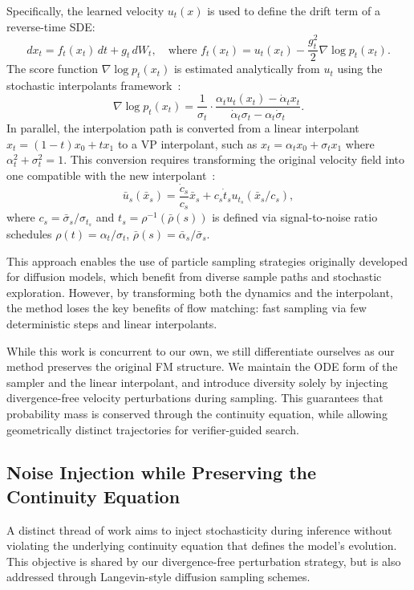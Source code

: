 \documentclass{article}
\begin{document}
Specifically, the learned velocity \( u_t(x) \) is used to define the drift term of a reverse-time SDE:
\[
d x_t = f_t(x_t)\,dt + g_t\,dW_t, \quad \text{where } f_t(x_t) = u_t(x_t) - \frac{g_t^2}{2} \nabla \log p_t(x_t).
\]
The score function \( \nabla \log p_t(x_t) \) is estimated analytically from \( u_t \) using the stochastic interpolants framework~\cite{ma2024sit}:
\[
\nabla \log p_t(x_t) = \frac{1}{\sigma_t} \cdot \frac{\alpha_t u_t(x_t) - \dot{\alpha}_t x_t}{\dot{\alpha}_t \sigma_t - \alpha_t \dot{\sigma}_t}.
\]
In parallel, the interpolation path is converted from a linear interpolant \( x_t = (1 - t)x_0 + t x_1 \) to a VP interpolant, such as \( x_t = \alpha_t x_0 + \sigma_t x_1 \) where \(\alpha_t^2 + \sigma_t^2 = 1\). This conversion requires transforming the original velocity field into one compatible with the new interpolant~\cite{kim2025flowits}:
\[
\bar{u}_s(\bar{x}_s) = \frac{\dot{c}_s}{c_s} \bar{x}_s + c_s \dot{t}_s u_{t_s}(\bar{x}_s / c_s),
\]
where \(c_s = \bar{\sigma}_s / \sigma_{t_s}\) and \(t_s = \rho^{-1}(\bar{\rho}(s))\) is defined via signal-to-noise ratio schedules \(\rho(t) = \alpha_t/\sigma_t\), \(\bar{\rho}(s) = \bar{\alpha}_s/\bar{\sigma}_s\).

This approach enables the use of particle sampling strategies originally developed for diffusion models, which benefit from diverse sample paths and stochastic exploration. However, by transforming both the dynamics and the interpolant, the method loses the key benefits of flow matching: fast sampling via few deterministic steps and linear interpolants.

While this work is concurrent to our own, we still differentiate ourselves as our method preserves the original FM structure. We maintain the ODE form of the sampler and the linear interpolant, and introduce diversity solely by injecting divergence-free velocity perturbations during sampling. This guarantees that probability mass is conserved through the continuity equation, while allowing geometrically distinct trajectories for verifier-guided search.

\subsection{Noise Injection while Preserving the Continuity Equation}

A distinct thread of work aims to inject stochasticity during inference without violating the underlying continuity equation that defines the model's evolution. This objective is shared by our divergence-free perturbation strategy, but is also addressed through Langevin-style diffusion sampling schemes.
\end{document}
